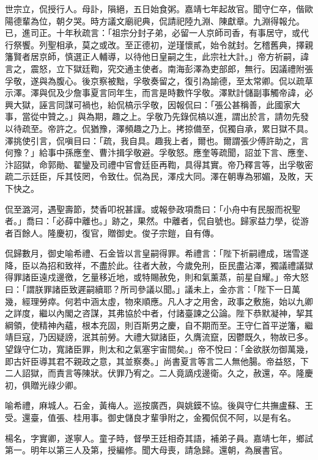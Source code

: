 \begin{pinyinscope}
{{世宗立，侃授行人。母訃，隕絕，五日始食粥。嘉靖七年起故官。聞守仁卒，偕歐陽德輩為位，朝夕哭。時方議文廟祀典，侃請祀陸九淵、陳獻章。九淵得報允。已，進司正。十年秋疏言：「祖宗分封子弟，必留一人京師司香，有事居守，或代行祭饗。列聖相承，莫之或改。至正德初，逆瑾懷貳，始令就封。乞稽舊典，擇親籓賢者居京師，慎選正人輔導，以待他日皇嗣之生，此宗社大計。」帝方祈嗣，諱言之，震怒，立下獄廷鞫，究交通主使者。南海彭澤為吏部郎，無行。因議禮附張孚敬，遂與為腹心。後京察被黜，孚敬奏留之，復引為諭德，至太常卿。侃以疏草示澤。澤與侃及少詹事夏言同年生，而言是時數忤孚敬。澤默計儲副事觸帝諱，必興大獄，誣言同謀可禍也，紿侃槁示孚敬，因報侃曰：「張公甚稱善，此國家大事，當從中贊之。」與為期，趣之上。孚敬乃先錄侃槁以進，謂出於言，請勿先發以待疏至。帝許之。侃猶豫，澤頻趣之乃上。拷掠備至，侃獨自承，累日獄不具。澤挑使引言，侃嗔目曰：「疏，我自具。趣我上者，爾也。爾謂張少傅許助之，言何豫？」給事中孫應奎、曹汴揖孚敬避。孚敬怒。應奎等疏聞，詔並下言、應奎、汴詔獄，命郭勛、翟鑾及司禮中官會廷臣再鞫，具得其實。帝乃釋言等，出孚敬密疏二示廷臣，斥其忮罔，令致仕。侃為民，澤戍大同。澤在朝專為邪媚，及敗，天下快之。

侃至潞河，遇聖壽節，焚香叩祝甚謹。或報參政項喬曰：「小舟中有民服而祝聖者。」喬曰：「必薛中離也。」跡之，果然。中離者，侃自號也。歸家益力學，從游者百餘人。隆慶初，復官，贈御史。俊子宗鎧，自有傳。

侃歸數月，御史喻希禮、石金皆以言皇嗣得罪。希禮言：「陛下祈嗣禮成，瑞雪遂降，臣以為招和致祥，不盡於此。往者大赦，今歲免刑，臣民盡沾澤，獨議禮議獄得罪諸臣遠戍邊徼，乞量移近地，或特賜赦免，則和氣薰蒸，前星自耀。」帝大怒曰：「謂朕罪諸臣致遲嗣續耶？所司參議以聞。」議未上，金亦言：「陛下一日萬幾，經理勞瘁。何若中涵太虛，物來順應。凡人才之用舍，政事之敷施，始以九卿之詳度，繼以內閣之咨謀，其弗協於中者，付諸臺諫之公論。陛下恭默凝神，挈其綱領，使精神內蘊，根本充固，則百斯男之慶，自不期而至。王守仁首平逆籓，繼靖巨寇，乃因疑謗，泯其前勞。大禮大獄諸臣，久膺流竄，因鬱既久，物故已多。望錄守仁功，寬諸臣罪，則太和之氣塞宇宙間矣。」帝不悅曰：「金欲朕勿御萬幾，即古奸臣導其君不親政之意，其並察奏。」尚書夏言等言二人無他腸。帝益怒，下二人詔獄，而責言等陳狀。伏罪乃宥之。二人竟謫戍邊衛。久之，赦還，卒。隆慶初，俱贈光祿少卿。

喻希禮，麻城人。石金，黃梅人。巡按廣西，與姚鏌不協。後與守仁共撫盧蘇、王受。還臺，值張、桂用事。御史儲良才輩爭附之，金獨侃侃不阿，以是有名。

楊名，字實卿，遂寧人。童子時，督學王廷相奇其語，補弟子員。嘉靖七年，鄉試第一。明年以第三人及第，授編修。聞大母喪，請急歸。還朝，為展書官。

}}
\end{pinyinscope}
